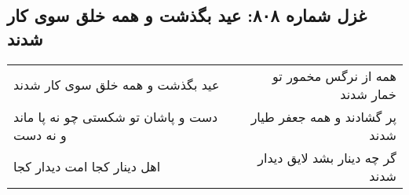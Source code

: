 \begin{center}
\section*{غزل شماره ۸۰۸: عید بگذشت و همه خلق سوی کار شدند}
\label{sec:0808}
\begin{longtable}{l p{0.5cm} r}
عید بگذشت و همه خلق سوی کار شدند
&&
همه از نرگس مخمور تو خمار شدند
\\
دست و پاشان تو شکستی چو نه پا ماند و نه دست
&&
پر گشادند و همه جعفر طیار شدند
\\
اهل دینار کجا امت دیدار کجا
&&
گر چه دینار بشد لایق دیدار شدند
\\
\end{longtable}
\end{center}
